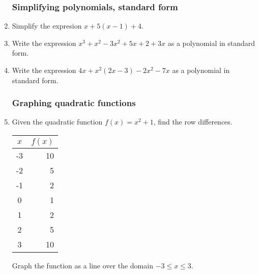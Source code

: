 \documentclass[12pt, oneside]{article}
\begin{document}
\begin{enumerate}
\newpage
\subsubsection*{Simplifying polynomials, standard form}

\item Simplify the expresion $x + 5(x-1)+4$.\vspace{4cm}
\item Write the expression $x^3+x^2-3x^2+5x+2+3x$ as a polynomial in standard form. \vspace{7cm}

  \item Write the expression $4x+x^2(2x-3)-2x^2-7x$ as a polynomial in standard form.

\newpage


\subsubsection*{Graphing quadratic functions}

\item Given the quadratic function $f(x)=x^2+1$, find the row differences.
  \renewcommand{\arraystretch}{1.6}
    \begin{center}
      \begin{tabular}{|c|r|}
      \hline
      $x$ & $f(x)$\\
      \hline
      -3 & 10 \\
      \hline
      -2 & 5 \\
      \hline
      -1 & 2 \\
      \hline
      0 & 1 \\
      \hline
      1 & 2 \\
      \hline
      2 & 5 \\
      \hline
      3 & 10 \\
      \hline
      \end{tabular}
    \end{center}
Graph the function as a line over the domain $-3 \leq x \leq 3$.

\begin{center} %
\end{center}


\end{enumerate}
\end{document}
